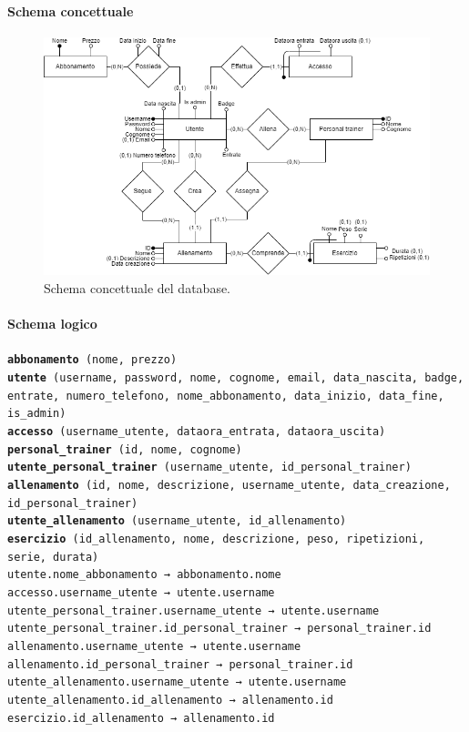 \documentclass[a4paper]{article}
\begin{document}
	\paragraph{Schema concettuale}
	\begin{figure}[H]
		\centering
		\includegraphics[scale=0.6]{immagini/schemaER.png}
		\caption{Schema concettuale del database.}
	\end{figure}

	\paragraph{Schema logico}
	\texttt{{\bf abbonamento} (nome, prezzo)\\
		{\bf utente} (username, password, nome, cognome, email, data\_nascita, badge, entrate, numero\_telefono, nome\_abbonamento, data\_inizio, data\_fine, is\_admin)\\
		{\bf accesso} (username\_utente, dataora\_entrata, dataora\_uscita)\\
		{\bf personal\_trainer} (id, nome, cognome)\\
		{\bf utente\_personal\_trainer} (username\_utente, id\_personal\_trainer)\\
		{\bf allenamento} (id, nome, descrizione, username\_utente, data\_creazione, id\_personal\_trainer)\\
		{\bf utente\_allenamento} (username\_utente, id\_allenamento)\\
		{\bf esercizio} (id\_allenamento, nome, descrizione, peso, ripetizioni, serie, durata)\\
		utente.nome\_abbonamento → abbonamento.nome\\
		accesso.username\_utente → utente.username\\
		utente\_personal\_trainer.username\_utente → utente.username\\
		utente\_personal\_trainer.id\_personal\_trainer → personal\_trainer.id\\
		allenamento.username\_utente → utente.username\\
		allenamento.id\_personal\_trainer → personal\_trainer.id\\
		utente\_allenamento.username\_utente → utente.username\\
		utente\_allenamento.id\_allenamento → allenamento.id\\
		esercizio.id\_allenamento → allenamento.id
}
\end{document}
